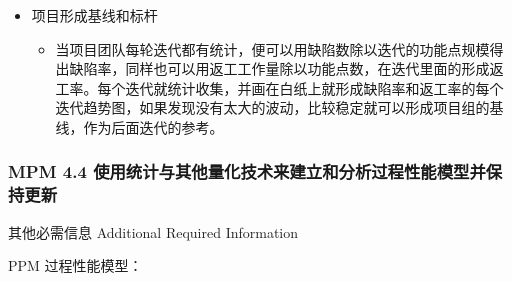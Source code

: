 \begin{itemize}
\tightlist
\item
  项目形成基线和标杆

  \begin{itemize}
  \tightlist
  \item
    当项目团队每轮迭代都有统计，便可以用缺陷数除以迭代的功能点规模得出缺陷率，同样也可以用返工工作量除以功能点数，在迭代里面的形成返工率。每个迭代就统计收集，并画在白纸上就形成缺陷率和返工率的每个迭代趋势图，如果发现没有太大的波动，比较稳定就可以形成项目组的基线，作为后面迭代的参考。
  \end{itemize}
\end{itemize}

\hypertarget{mpm-4.4-ux4f7fux7528ux7edfux8ba1ux4e0eux5176ux4ed6ux91cfux5316ux6280ux672fux6765ux5efaux7acbux548cux5206ux6790ux8fc7ux7a0bux6027ux80fdux6a21ux578bux5e76ux4fddux6301ux66f4ux65b0}{%
\subsubsection{MPM 4.4
使用统计与其他量化技术来建立和分析过程性能模型并保持更新}\label{mpm-4.4-ux4f7fux7528ux7edfux8ba1ux4e0eux5176ux4ed6ux91cfux5316ux6280ux672fux6765ux5efaux7acbux548cux5206ux6790ux8fc7ux7a0bux6027ux80fdux6a21ux578bux5e76ux4fddux6301ux66f4ux65b0}}

其他必需信息 Additional Required Information

\begin{description}
\tightlist
\item[]
PPM 过程性能模型：
\end{description}

